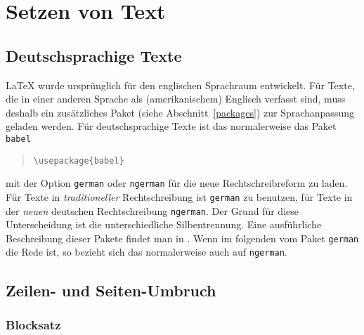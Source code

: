  
\section{Setzen von Text}
 

\subsection{Deutschsprachige Texte}\label{deutsch}
\LaTeX{} wurde ursprünglich für den englischen Sprachraum entwickelt.
Für Texte, die in einer anderen Sprache als (amerikanischem)
Englisch verfasst sind, muss deshalb ein zusätzliches Paket 
(siehe Abschnitt~\ref{packages}) zur Sprachanpassung geladen werden.  
Für deutschsprachige Texte ist das normalerweise das Paket \texttt{babel} 
\begin{verse}
\verb:\usepackage{babel}:
\end{verse}
mit der Option \texttt{german} oder \texttt{ngerman} für die neue
Rechtschreibreform zu laden.
Für Texte in \emph{traditioneller} Rechtschreibung ist \texttt{german}
zu benutzen, für Texte in der \emph{neuen} deutschen Rechtschreibung
\texttt{ngerman}.
Der Grund für diese Unterscheidung ist die unterschiedliche Silbentrennung.
Eine ausführliche Beschreibung dieser Pakete findet man in \cite{germdoc}.  
Wenn im folgenden vom Paket \texttt{german} die Rede ist, 
so bezieht sich das normalerweise auch auf \texttt{ngerman}.


\subsection{Zeilen- und Seiten-Umbruch}

\subsubsection{Blocksatz}

